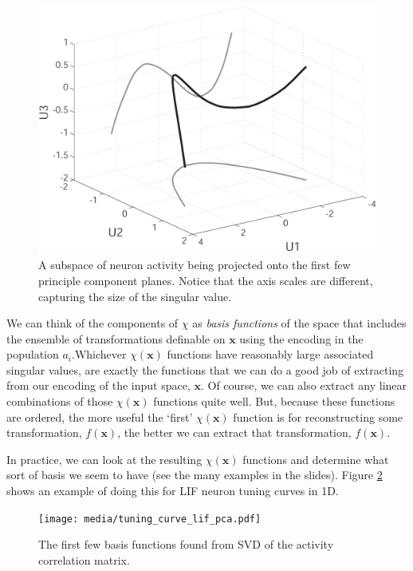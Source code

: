 \documentclass[10pt,letterpaper,oneside]{article}
\begin{document}
\begin{figure}[h]
  \centering
  \includegraphics[scale=0.5]{media/c5.chi.projections.pdf}
  \caption{A subspace of neuron activity being projected onto the first few principle component planes. Notice that the axis scales are different, capturing the size of the singular value.}
	\label{svd.projection}
\end{figure}

We can think of the components of $\chi$ as \emph{basis
functions} of the space that includes the ensemble of transformations
definable on $\mathbf{x}$ using the encoding in the population $a_{i}$.Whichever $\chi(\mathbf{x})$ functions have reasonably large associated
singular values, are exactly the functions that we can do a good job
of extracting from our encoding of the input space, $\mathbf{x}$.
Of course, we can also extract any linear combinations of those $\chi(\mathbf{x})$
functions quite well. But, because these functions are ordered, the
more useful the `first' $\chi(\mathbf{x})$ function is for reconstructing
some transformation, $f(\mathbf{x})$, the better we can extract that
transformation, $f(\mathbf{x})$.

In practice, we can look at the resulting $\chi(\mathbf{x})$ functions
and determine what sort of basis we seem to have (see the many examples in the slides). Figure \ref{lif.pca} shows an example of doing this for LIF neuron tuning curves in 1D.

\begin{figure}[t]
  \centering
  \texttt{[image: media/tuning\_curve\_lif\_pca.pdf]}
  \caption{The first few basis functions found from SVD of the activity correlation matrix.}
	\label{lif.pca}
\end{figure}
\end{document}
